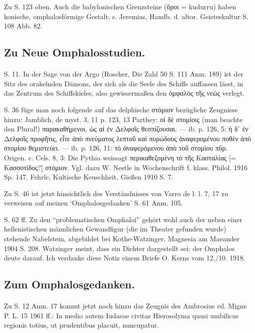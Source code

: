 \documentclass[a4paper, 11pt, oneside]{article}
\begin{document}
Zu S. 123 oben. Auch die babylonischen Grenzsteine (ὅροι = kudurru) haben konische, omphalosförmige Gestalt; s. Jeremias, Handb. d. altor. Geisteskultur S. 108 Abb. 82.

\subsection{Zu Neue Omphalosstudien.}
\paragraph{}
S. 11. In der Sage von der Argo (Roscher, Die Zahl 50 S. 111 Anm. 189) ist der Sitz des orakelnden Dämons, der sich als die Seele des Schiffs auffassen lässt, in das Zentrum des Schiffskieles, also gewissermaßen den ὀμφαλὸς τῆς νεώς verlegt.

S. 36 füge man noch folgende auf das delphische στόμιον bezügliche Zeugnisse hinzu: Jamblich, de myst. 3, 11 p. 123, 13 Parthey: οἱ δὲ στομίοις (man beachte den Plural!) παρακαθήμενοι, ὡς αἱ ἐν Δελφοῖς θεσπίζουσαι. --- ib. p. 126, 5: ἡ δ᾽ ἐν Δελφοῖς προφῆτις, εἶτε ἀπὸ πνεύματος λεπτοῦ καὶ πυρώδους ἀναφερομένου ποθὲν ἀπὸ στομίου θεμιστεύει. --- ib. p. 126, 11: τὸ ἀναφερόμενου ἀπὸ τοῦ στομίου πῦρ. Origen. c. Cels. 8, 3: Die Pythia weissagt περικαθεζομένη τὸ τῆς Κασταλίας [= Κασσοτίδος?] στόμιον. Vgl. dazu W. Nestle in Wochenschrift f. klass. Philol. 1916 Sp. 147. Fehrle, Kultische Keuschheit, Gießen 1910 S. 7.

Zu S. 46 ist jetzt hinsichtlich des Verständnisses von Varro de l. l. 7, 17 zu verweisen auf meinen `Omphalosgedanken' S. 61 Anm. 105.

S. 62 ff. Zu den "`problematischen Omphaloi"' gehört wohl auch der neben einer hellenistischen männlichen Gewandfigur (die im Theater gefunden wurde) stehende Nabelstein, abgebildet bei Kothe-Watzinger, Magnesia am Maeander 1904 S. 208. Watzinger meint, dass ein Dichter dargestellt sei; der Omphalos deute darauf. Ich verdanke diese Notiz einem Briefe O. Kerns vom 12./10. 1918.

\subsection{Zum Omphalosgedanken.}
\paragraph{}
Zu S. 12 Anm. 17 kommt jetzt noch hinzu das Zeugnis des Ambrosius ed. Migne P. L. 15 1961 ff.: In medio autem Iudaeae civitas Hierosolyma quasi umbilicus regionis totius, ut prudentibus placuit, nuncupatur.
\end{document}
